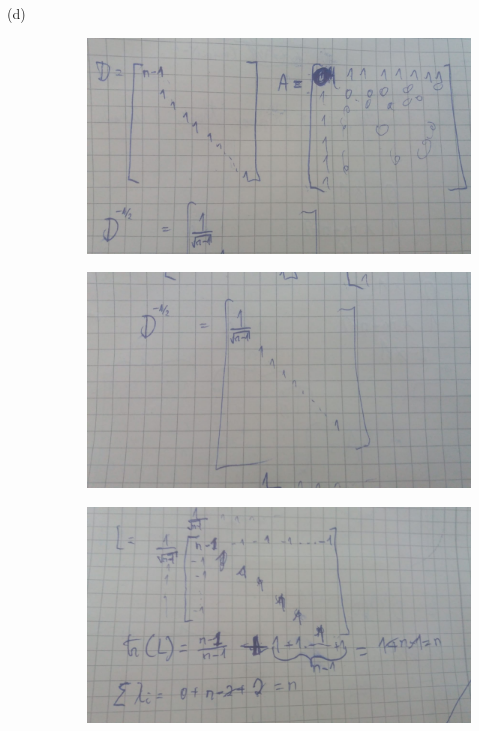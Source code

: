 \documentclass[14pt]{article}
\begin{document}
\begin{description}
\item[(d)]
\begin{figure}[h]
  \includegraphics[scale=0.3]{a10-ex1-d1.jpeg}
\end{figure}
\begin{figure}[h]
  \includegraphics[scale=0.3]{a10-ex1-d2.jpeg}
\end{figure}
\begin{figure}[h]
  \includegraphics[scale=0.3]{a10-ex1-d3.jpeg}
\end{figure}

\end{description}
\end{document}

